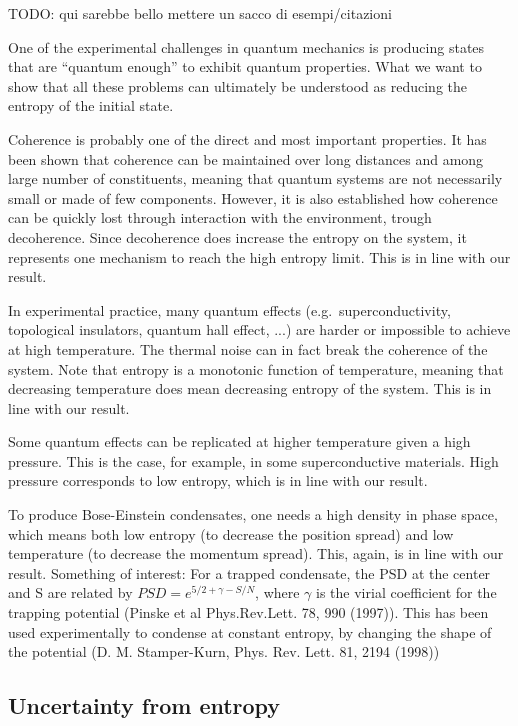 \documentclass{article}
\begin{document}
TODO: qui sarebbe bello mettere un sacco di esempi/citazioni

One of the experimental challenges in quantum mechanics is producing states that are ``quantum enough'' to exhibit quantum properties. What we want to show that all these problems can ultimately be understood as reducing the entropy of the initial state.

Coherence is probably one of the direct and most important properties. It has been shown that coherence can be maintained over long distances and among large number of constituents, meaning that quantum systems are not necessarily small or made of few components. However, it is also established how coherence can be quickly lost through interaction with the environment, trough decoherence. Since decoherence does increase the entropy on the system, it represents one mechanism to reach the high entropy limit. This is in line with our result.

In experimental practice, many quantum effects (e.g.~superconductivity, topological insulators, quantum hall effect, ...) are harder or impossible to achieve at high temperature. The thermal noise can in fact break the coherence of the system. Note that entropy is a monotonic function of temperature, meaning that decreasing temperature does mean decreasing entropy of the system. This is in line with our result.

Some quantum effects can be replicated at higher temperature given a high pressure. This is the case, for example, in some superconductive materials. High pressure corresponds to low entropy, which is in line with our result.

To produce Bose-Einstein condensates, one needs a high density in phase space, which means both low entropy (to decrease the position spread) and low temperature (to decrease the momentum spread). This, again, is in line with our result.
{\color{blue} Something of interest: For a trapped condensate, the PSD at the center and S are related by $PSD=e^{5/2+\gamma-S/N}$, where $\gamma$ is the virial coefficient for the trapping potential (Pinske et al Phys.Rev.Lett. 78, 990 (1997)). This has been used experimentally to condense at constant entropy, by changing the shape of the potential (D. M. Stamper-Kurn, Phys. Rev. Lett. 81, 2194 (1998))}

\subsection{Uncertainty from entropy}
\end{document}
